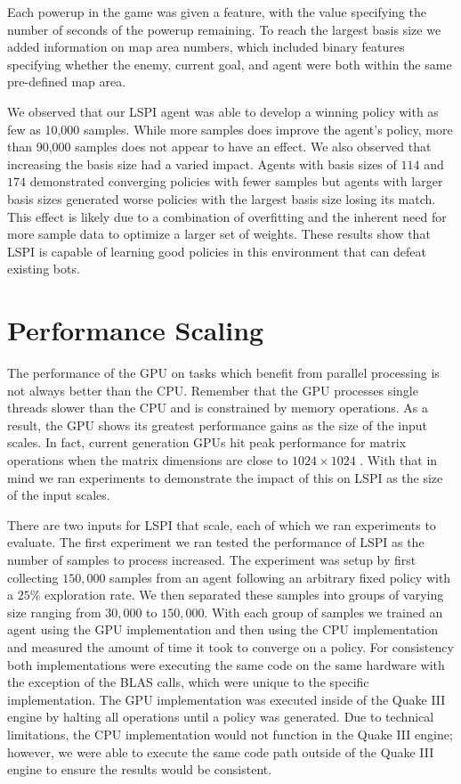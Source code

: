 Each powerup in the game was given a feature, with the value specifying the number of seconds of the powerup remaining. To reach the largest basis size we added information on map area numbers, which included binary features specifying whether the enemy, current goal, and agent were both within the same pre-defined map area.

We observed that our LSPI agent was able to develop a winning policy with as few as 10,000 samples. While more samples does improve the agent's policy, more than 90,000 samples does not appear to have an effect. We also observed that increasing the basis size had a varied impact. Agents with basis sizes of $114$ and $174$ demonstrated converging policies with fewer samples but agents with larger basis sizes generated worse policies with the largest basis size losing its match. This effect is likely due to a combination of overfitting and the inherent need for more sample data to optimize a larger set of weights. These results show that LSPI is capable of learning good policies in this environment that can defeat existing bots.

\section{Performance Scaling}

The performance of the GPU on tasks which benefit from parallel processing is not always better than the CPU. Remember that the GPU processes single threads slower than the CPU and is constrained by memory operations. As a result, the GPU shows its greatest performance gains as the size of the input scales. In fact, current generation GPUs hit peak performance for matrix operations when the matrix dimensions are close to $1024 \times 1024$ \cite{cuda:perf}. With that in mind we ran experiments to demonstrate the impact of this on LSPI as the size of the input scales.

There are two inputs for LSPI that scale, each of which we ran experiments to evaluate. The first experiment we ran tested the performance of LSPI as the number of samples to process increased. The experiment was setup by first collecting $150,000$ samples from an agent following an arbitrary fixed policy with a $25\%$ exploration rate. We then separated these samples into groups of varying size ranging from $30,000$ to $150,000$. With each group of samples we trained an agent using the GPU implementation and then using the CPU implementation and measured the amount of time it took to converge on a policy. For consistency both implementations were executing the same code on the same hardware with the exception of the BLAS calls, which were unique to the specific implementation. The GPU implementation was executed inside of the Quake III engine by halting all operations until a policy was generated. Due to technical limitations, the CPU implementation would not function in the Quake III engine; however, we were able to execute the same code path outside of the Quake III engine to ensure the results would be consistent.

